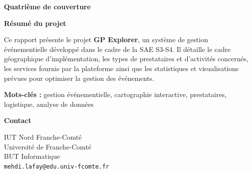 \documentclass[12pt,a4paper]{article}
\begin{document}
\begin{center}
    \Large \textbf{Quatrième de couverture}
    \vspace{2cm}
    
    \begin{minipage}{0.8\textwidth}
        \centering
        
        \textbf{Résumé du projet}
        
        \vspace{1cm}
        
        Ce rapport présente le projet \textbf{GP Explorer}, un système de gestion événementielle développé dans le cadre de la SAE S3-S4. Il détaille le cadre géographique d'implémentation, les types de prestataires et d'activités concernés, les services fournis par la plateforme ainsi que les statistiques et visualisations prévues pour optimiser la gestion des événements.
        
        \vspace{1cm}
        
        \textbf{Mots-clés :} gestion événementielle, cartographie interactive, prestataires, logistique, analyse de données
        
        \vspace{2cm}
        
        \textbf{Contact}
        
        IUT Nord Franche-Comté \\
        Université de Franche-Comté \\
        BUT Informatique \\
        \texttt{mehdi.lafay@edu.univ-fcomte.fr}
        
    \end{minipage}
\end{center}

\vspace*{\fill}
\end{document}
